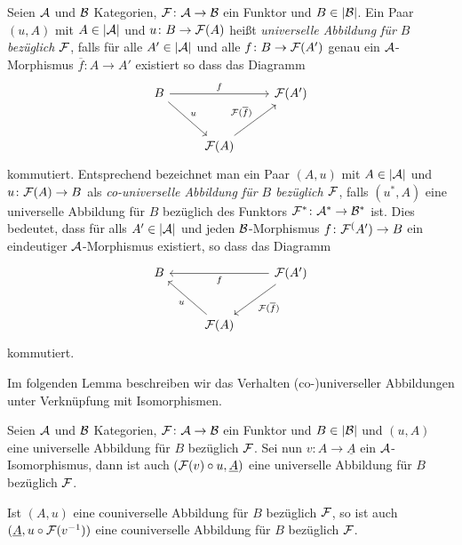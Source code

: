 \begin{defn}
  Seien $\mathcal{A}$ und $\mathcal{B}$ Kategorien, $\mathcal{F} \colon \mathcal{A} \to \mathcal{B}$ ein Funktor und $B \in |\mathcal{B}|$.
  Ein Paar $(u, A)$ mit $A \in |\mathcal{A}|$ und $u \colon B \to \mathcal{F}(A)$ heißt \emph{universelle Abbildung für $B$ bezüglich $\mathcal{F}$}, falls für alle $A' \in |\mathcal{A}|$ und alle $f \colon B \to \mathcal{F}(A')$ genau ein $\mathcal{A}$-Morphismus $\overline f \colon A \to A'$ existiert so dass das Diagramm
  $$
  \begin{tikzcd}[row sep=2.5em]
    B \arrow[rd,"u"] \arrow[rr, "f"] &&\F(A') \\
    &\F(A) \arrow[ru, "\F(\overline{f})"]
  \end{tikzcd}
  $$
  kommutiert.
  Entsprechend bezeichnet man ein Paar $(A,u)$ mit $A \in |\mathcal{A}|$ und $u \colon \mathcal{F}(A) \to B$ als \emph{co-universelle Abbildung für $B$ bezüglich $\mathcal{F}$}, falls $(u^*, A)$ eine universelle Abbildung für $B$ bezüglich des Funktors $\mathcal{F}^* \colon \mathcal{A}^* \to \mathcal{B}^*$ ist.
  Dies bedeutet, dass für alls $A' \in |\mathcal{A}|$ und jeden $\mathcal{B}$-Morphismus $f \colon \mathcal{F}^(A') \to B$ ein eindeutiger $\mathcal{A}$-Morphismus existiert, so dass das Diagramm
  $$
  \begin{tikzcd}[row sep=2.5em]
    B  &&  \arrow[ll, "f"] \F(A')\arrow[ld, "\F(\overline{f})"]  \\
    & \arrow[lu,"u"]\F(A) & 
  \end{tikzcd}
  $$
  kommutiert.
\end{defn}

Im folgenden Lemma beschreiben wir das Verhalten (co-)universeller Abbildungen unter Verknüpfung mit Isomorphismen.

\begin{lem}
  \label{lem:universalCircIso}
  Seien $\mathcal{A}$ und $\mathcal{B}$ Kategorien, $\mathcal{F} \colon \mathcal{A} \to \mathcal{B}$ ein Funktor und $B \in |\mathcal{B}|$ und $(u,A)$ eine universelle Abbildung für $B$ bezüglich $\mathcal{F}$.
  Sei nun $v \colon A \to \underline A$ ein $\mathcal{A}$-Isomorphismus, dann ist auch $(\mathcal{F}(v) \circ u, \underline A )$ eine universelle Abbildung für $B$ bezüglich $\mathcal{F}$.

  Ist $(A, u)$ eine couniverselle Abbildung für $B$ bezüglich $\mathcal{F}$, so ist auch $(\underline A, u \circ \mathcal{F}(v^{-1}))$ eine couniverselle Abbildung für $B$ bezüglich $\mathcal{F}$.
\end{lem}


